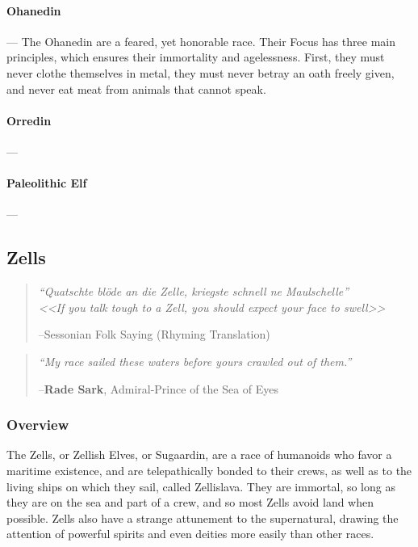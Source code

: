\documentclass[oneside,11pt,english]{book}
\begin{document}
\paragraph*{Ohanedin}---\quad
The Ohanedin are a feared, yet honorable race. Their Focus has three main principles, which ensures their immortality and agelessness. First, they must never clothe themselves in metal, they must never betray an oath freely given, and never eat meat from animals that cannot speak.

\paragraph*{Orredin}---%

\paragraph*{Paleolithic Elf}---

\subsection{Zells}\label{sec:zells}
\begin{quote}
  \centering
  \emph{“Quatschte blöde an die Zelle, kriegste schnell ne Maulschelle”}\\
  \emph{<<\emph{If you talk tough to a Zell, you should expect your face to swell}>>}\par
  \hfill --Sessonian Folk Saying (Rhyming Translation)
\end{quote}

\begin{quote}
  \emph{“My race sailed these waters before yours crawled out of them.”}\par
  \hfill --\textbf{Rade Sark}, Admiral-Prince of the Sea of Eyes
\end{quote}

\subsubsection*{Overview} 
The Zells, or Zellish Elves, or Sugaardin, are a race of humanoids who favor a maritime existence, and are telepathically bonded to their crews, as well as to the living ships on which they sail, called Zellislava. They are immortal, so long as they are on the sea and part of a crew, and so most Zells avoid land when possible. Zells also have a strange attunement to the supernatural, drawing the attention of powerful spirits and even deities more easily than other races. 
\end{document}
